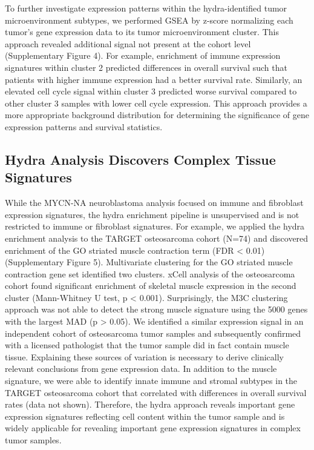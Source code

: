 \documentclass[10pt,letterpaper]{article}
\begin{document}
To further investigate expression patterns within the hydra-identified tumor microenvironment subtypes, we performed GSEA by z-score normalizing each tumor’s gene expression data to its tumor microenvironment cluster. This approach revealed additional signal not present at the cohort level (Supplementary Figure 4). For example, enrichment of immune expression signatures within cluster 2 predicted differences in overall survival such that patients with higher immune expression had a better survival rate. Similarly, an elevated cell cycle signal within cluster 3 predicted worse survival compared to other cluster 3 samples with lower cell cycle expression. This approach provides a more appropriate background distribution for determining the significance of gene expression patterns and survival statistics.

\subsection{Hydra Analysis Discovers Complex Tissue Signatures}
While the MYCN-NA neuroblastoma analysis focused on immune and fibroblast expression signatures, the hydra enrichment pipeline is unsupervised and is not restricted to immune or fibroblast signatures. For example, we applied the hydra enrichment analysis to the TARGET osteosarcoma cohort (N=74) and discovered enrichment of the GO striated muscle contraction term (FDR < 0.01) (Supplementary Figure 5). Multivariate clustering for the GO striated muscle contraction gene set identified two clusters. xCell analysis of the osteosarcoma cohort found significant enrichment of skeletal muscle expression in the second cluster (Mann-Whitney U test, p < 0.001). Surprisingly, the M3C clustering approach was not able to detect the strong muscle signature using the 5000 genes with the largest MAD (p > 0.05). We identified a similar expression signal in an independent cohort of osteosarcoma tumor samples and subsequently confirmed with a licensed pathologist that the tumor sample did in fact contain muscle tissue. Explaining these sources of variation is necessary to derive clinically relevant conclusions from gene expression data. In addition to the muscle signature, we were able to identify innate immune and stromal subtypes in the TARGET osteosarcoma cohort that correlated with differences in overall survival rates (data not shown). Therefore, the hydra approach reveals important gene expression signatures reflecting cell content within the tumor sample and is widely applicable for revealing important gene expression signatures in complex tumor samples.
\end{document}
